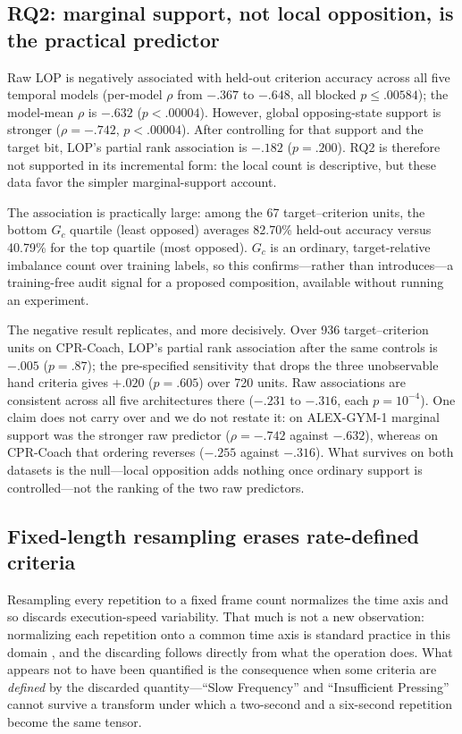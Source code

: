 \documentclass[conference,a4paper]{IEEEtran}
\begin{document}
\subsection{RQ2: marginal support, not local opposition, is the practical predictor}
Raw LOP is negatively associated with held-out criterion accuracy across all five
temporal models (per-model $\rho$ from $-.367$ to $-.648$, all blocked
$p\leq.00584$); the model-mean $\rho$ is $-.632$ ($p<.00004$). However, global
opposing-state support is stronger ($\rho=-.742$, $p<.00004$). After controlling
for that support and the target bit, LOP's partial rank association is $-.182$
($p=.200$). RQ2 is therefore not supported in its incremental form: the local
count is descriptive, but these data favor the simpler marginal-support account.

The association is practically large: among the 67 target--criterion units,
the bottom $G_c$ quartile (least opposed) averages 82.70\% held-out accuracy
versus 40.79\% for the top quartile (most opposed). $G_c$ is an ordinary, target-relative imbalance count over
training labels, so this confirms---rather than introduces---a training-free
audit signal for a proposed composition, available without running an experiment.

The negative result replicates, and more decisively. Over 936 target--criterion
units on CPR-Coach, LOP's partial rank association after the same controls is
$-.005$ ($p=.87$); the pre-specified sensitivity that drops the three
unobservable hand criteria gives $+.020$ ($p=.605$) over 720 units. Raw
associations are consistent across all five architectures there ($-.231$ to
$-.316$, each $p=10^{-4}$). One claim does not carry over and we do not restate
it: on ALEX-GYM-1 marginal support was the stronger raw predictor
($\rho=-.742$ against $-.632$), whereas on CPR-Coach that ordering reverses
($-.255$ against $-.316$). What survives on both datasets is the null---local
opposition adds nothing once ordinary support is controlled---not the ranking of
the two raw predictors.

\subsection{Fixed-length resampling erases rate-defined criteria}
\label{sec:rate}
Resampling every repetition to a fixed frame count normalizes the time axis and
so discards execution-speed variability. That much is not a new observation:
normalizing each repetition onto a common time axis is standard practice in
this domain \cite{turner2026markerless}, and the discarding follows directly
from what the operation does. What appears not to have been quantified is the
consequence when some criteria are \emph{defined} by the discarded
quantity---``Slow Frequency'' and ``Insufficient Pressing'' cannot survive a
transform under which a two-second and a six-second repetition become the same
tensor.
\end{document}
